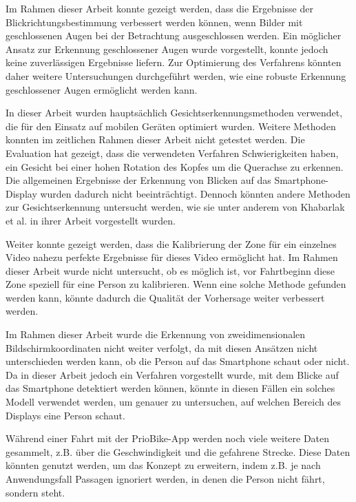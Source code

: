 Im Rahmen dieser Arbeit konnte gezeigt werden, dass die Ergebnisse der Blickrichtungsbestimmung verbessert werden können, wenn Bilder mit geschlossenen Augen bei der Betrachtung ausgeschlossen werden. Ein möglicher Ansatz zur Erkennung geschlossener Augen wurde vorgestellt, konnte jedoch keine zuverlässigen Ergebnisse liefern. Zur Optimierung des Verfahrens könnten daher weitere Untersuchungen durchgeführt werden, wie eine robuste Erkennung geschlossener Augen ermöglicht werden kann.

In dieser Arbeit wurden hauptsächlich Gesichtserkennungsmethoden verwendet, die für den Einsatz auf mobilen Geräten optimiert wurden. Weitere Methoden konnten im zeitlichen Rahmen dieser Arbeit nicht getestet werden. Die Evaluation hat gezeigt, dass die verwendeten Verfahren Schwierigkeiten haben, ein Gesicht bei einer hohen Rotation des Kopfes um die Querachse zu erkennen. Die allgemeinen Ergebnisse der Erkennung von Blicken auf das Smartphone-Display wurden dadurch nicht beeinträchtigt. Dennoch könnten andere Methoden zur Gesichtserkennung untersucht werden, wie sie unter anderem von Khabarlak et al. in ihrer Arbeit \cite{paper:face:survey} vorgestellt wurden. 

Weiter konnte gezeigt werden, dass die Kalibrierung der Zone für ein einzelnes Video nahezu perfekte Ergebnisse für dieses Video ermöglicht hat. Im Rahmen dieser Arbeit wurde nicht untersucht, ob es möglich ist, vor Fahrtbeginn diese Zone speziell für eine Person zu kalibrieren. Wenn eine solche Methode gefunden werden kann, könnte dadurch die Qualität der Vorhersage weiter verbessert werden.

Im Rahmen dieser Arbeit wurde die Erkennung von zweidimensionalen Bildschirmkoordinaten nicht weiter verfolgt, da mit diesen Ansätzen nicht unterschieden werden kann, ob die Person auf das Smartphone schaut oder nicht. Da in dieser Arbeit jedoch ein Verfahren vorgestellt wurde, mit dem Blicke auf das Smartphone detektiert werden können, könnte in diesen Fällen ein solches Modell verwendet werden, um genauer zu untersuchen, auf welchen Bereich des Displays eine Person schaut.

Während einer Fahrt mit der PrioBike-App werden noch viele weitere Daten gesammelt, z.B. über die Geschwindigkeit und die gefahrene Strecke. Diese Daten könnten genutzt werden, um das Konzept zu erweitern, indem z.B. je nach Anwendungsfall Passagen ignoriert werden, in denen die Person nicht fährt, sondern steht.



